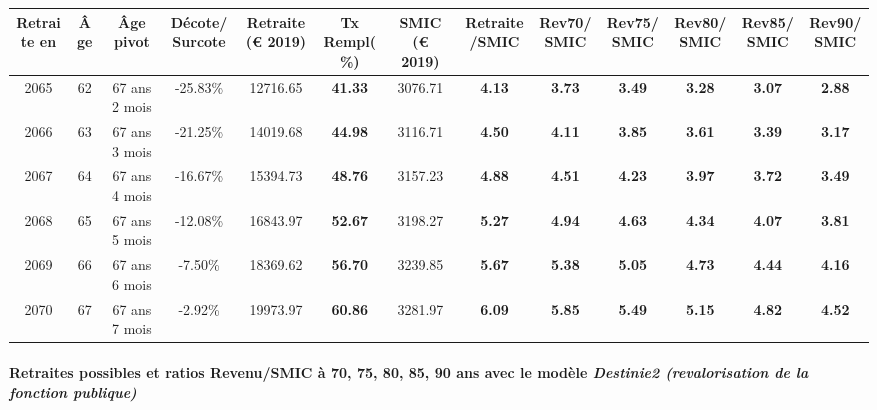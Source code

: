 { \scriptsize \begin{center} 
\begin{tabular}[htb]{|c|c||c|c||c|c||c||c|c|c|c|c|c|} 
\hline 
 Retraite en &  Âge &  Âge pivot &  Décote/Surcote &  Retraite (\euro{} 2019) &  Tx Rempl(\%) &  SMIC (\euro{} 2019) &  Retraite/SMIC &  Rev70/SMIC &  Rev75/SMIC &  Rev80/SMIC &  Rev85/SMIC &  Rev90/SMIC \\ 
\hline \hline 
 2065 &  62 &  67 ans 2 mois &  -25.83\% &  12716.65 &  {\bf 41.33} &  3076.71 &  {\bf 4.13} &  {\bf 3.73} &  {\bf 3.49} &  {\bf 3.28} &  {\bf 3.07} &  {\bf 2.88} \\ 
\hline 
 2066 &  63 &  67 ans 3 mois &  -21.25\% &  14019.68 &  {\bf 44.98} &  3116.71 &  {\bf 4.50} &  {\bf 4.11} &  {\bf 3.85} &  {\bf 3.61} &  {\bf 3.39} &  {\bf 3.17} \\ 
\hline 
 2067 &  64 &  67 ans 4 mois &  -16.67\% &  15394.73 &  {\bf 48.76} &  3157.23 &  {\bf 4.88} &  {\bf 4.51} &  {\bf 4.23} &  {\bf 3.97} &  {\bf 3.72} &  {\bf 3.49} \\ 
\hline 
 2068 &  65 &  67 ans 5 mois &  -12.08\% &  16843.97 &  {\bf 52.67} &  3198.27 &  {\bf 5.27} &  {\bf 4.94} &  {\bf 4.63} &  {\bf 4.34} &  {\bf 4.07} &  {\bf 3.81} \\ 
\hline 
 2069 &  66 &  67 ans 6 mois &  -7.50\% &  18369.62 &  {\bf 56.70} &  3239.85 &  {\bf 5.67} &  {\bf 5.38} &  {\bf 5.05} &  {\bf 4.73} &  {\bf 4.44} &  {\bf 4.16} \\ 
\hline 
 2070 &  67 &  67 ans 7 mois &  -2.92\% &  19973.97 &  {\bf 60.86} &  3281.97 &  {\bf 6.09} &  {\bf 5.85} &  {\bf 5.49} &  {\bf 5.15} &  {\bf 4.82} &  {\bf 4.52} \\ 
\hline 
\hline 
\end{tabular} 
\end{center} } 
\paragraph{Retraites possibles et ratios Revenu/SMIC à 70, 75, 80, 85, 90 ans avec le modèle \emph{Destinie2 (revalorisation de la fonction publique)}}  
 

